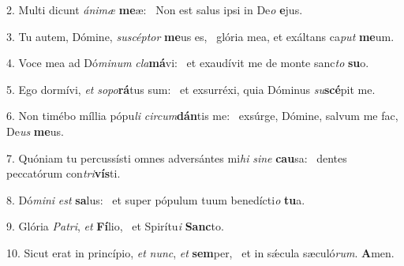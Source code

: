 2. Multi dicunt \textit{á}\textit{ni}\textit{mæ} \textbf{me}æ: \ast\  Non est salus ipsi in De\textit{o} \textbf{e}jus.\

3. Tu autem, Dómine, \textit{su}\textit{scép}\textit{tor} \textbf{me}us es, \ast\  glória mea, et exáltans ca\textit{put} \textbf{me}um.\

4. Voce mea ad Dó\textit{mi}\textit{num} \textit{cla}\textbf{má}vi: \ast\  et exaudívit me de monte sanc\textit{to} \textbf{su}o.\

5. Ego dormívi, \textit{et} \textit{so}\textit{po}\textbf{rá}tus sum: \ast\  et exsurréxi, quia Dóminus \textit{su}\textbf{scé}pit me.\

6. Non timébo míllia pópu\textit{li} \textit{cir}\textit{cum}\textbf{dán}tis me: \ast\  exsúrge, Dómine, salvum me fac, De\textit{us} \textbf{me}us.\

7. Quóniam tu percussísti omnes adversántes mi\textit{hi} \textit{si}\textit{ne} \textbf{cau}sa: \ast\  dentes peccatórum con\textit{tri}\textbf{vís}ti.\

8. Dó\textit{mi}\textit{ni} \textit{est} \textbf{sa}lus: \ast\  et super pópulum tuum benedícti\textit{o} \textbf{tu}a.\

9. Glória \textit{Pa}\textit{tri}, \textit{et} \textbf{Fí}lio, \ast\  et Spirítu\textit{i} \textbf{Sanc}to.\

10. Sicut erat in princípio, \textit{et} \textit{nunc}, \textit{et} \textbf{sem}per, \ast\  et in sǽcula sæculó\textit{rum}. \textbf{A}men.\

